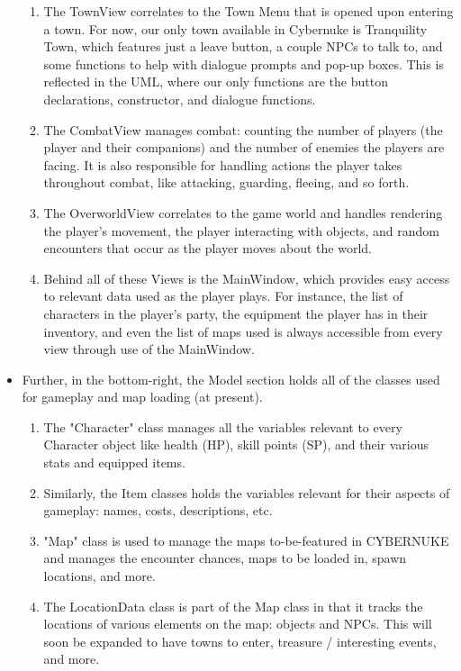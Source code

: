 \documentclass[10pt,conference,onecolumn,compsoc]{IEEEtran}
\begin{document}
\begin{itemize}
\begin{enumerate}
	\item The TownView correlates to the Town Menu that is opened upon entering a town. For now, our only town available in Cybernuke is Tranquility Town, which features just a leave button, a couple NPCs to talk to, and some functions to help with dialogue prompts and pop-up boxes. This is reflected in the UML, where our only functions are the button declarations, constructor, and dialogue functions.

	\item The CombatView manages combat: counting the number of players (the player and their companions) and the number of enemies the players are facing. It is also responsible for handling actions the player takes throughout combat, like attacking, guarding, fleeing, and so forth. 

	\item The OverworldView correlates to the game world and handles rendering the player's movement, the player interacting with objects, and random encounters that occur as the player moves about the world.

	\item Behind all of these Views is the MainWindow, which provides easy access to relevant data used as the player plays. For instance, the list of characters in the player's party, the equipment the player has in their inventory, and even the list of maps used is always accessible from every view through use of the MainWindow.
	\end{enumerate} 
	

\item Further, in the bottom-right, the Model section holds all of the classes used for gameplay and map loading (at present). 

	\begin{enumerate}
	\item The "Character" class manages all the variables relevant to every Character object like health (HP), skill points (SP), and their various stats and equipped items. 
	\item Similarly, the Item classes holds the variables relevant for their aspects of gameplay: names, costs, descriptions, etc. 
	\item "Map" class is used to manage the maps to-be-featured in CYBERNUKE and manages the encounter chances, maps to be loaded in, spawn locations, and more. 
	\item The LocationData class is part of the Map class in that it tracks the locations of various elements on the map: objects and NPCs. This will soon be expanded to have towns to enter, treasure / interesting events, and more.
	\end{enumerate}
	


\end{itemize}
\end{document}
